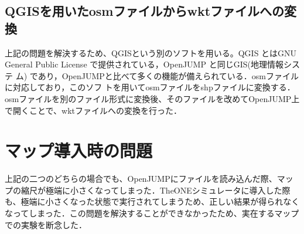 \documentclass[11pt]{icsthesis}
\begin{document}
\subsection{QGISを用いたosmファイルからwktファイルへの変換}
上記の問題を解決するため、QGISという別のソフトを用いる。QGIS とはGNU General Public License で提供されている，OpenJUMP と同じGIS(地理情報システ
ム) であり，OpenJUMPと比べて多くの機能が備えられている．osmファイルに対応しており，このソフ
トを用いてosmファイルをshpファイルに変換する．osmファイルを別のファイル形式に変換後、そのファイルを改めてOpenJUMP上で開くことで、wktファイルへの変換を行った．
\section{マップ導入時の問題}
上記の二つのどちらの場合でも、OpenJUMPにファイルを読み込んだ際、マップの縮尺が極端に小さくなってしまった．TheONEシミュレータに導入した際も、極端に小さくなった状態で実行されてしまうため、正しい結果が得られなくなってしまった．この問題を解決することができなかったため、実在するマップでの実験を断念した．
\end{document}

